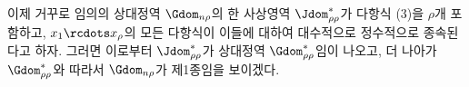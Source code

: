 
이제 거꾸로 임의의 상대정역 $\Gdom_{n\rho}$의 한 사상영역 $\Jdom^*_{\rho\rho}$가 다항식 (3)을 $\rho$개 포함하고, $x_1\rcdots x_\rho$의 모든 다항식이 이들에 대하여 대수적으로 정수적으로 종속된다고 하자. 그러면 이로부터 $\Jdom^*_{\rho\rho}$가 상대정역 $\Gdom^*_{\rho\rho}$임이 나오고, 더 나아가 $\Gdom^*_{\rho\rho}$와 따라서 $\Gdom_{n\rho}$가 제1종임을 보이겠다.
